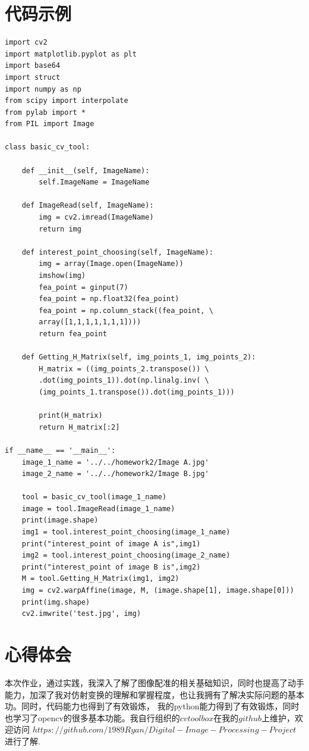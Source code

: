 \documentclass[UTF8]{ctexart}
\begin{document}
\section{代码示例}

\begin{lstlisting}
import cv2
import matplotlib.pyplot as plt
import base64
import struct
import numpy as np
from scipy import interpolate
from pylab import *
from PIL import Image

class basic_cv_tool:

	def __init__(self, ImageName):
		self.ImageName = ImageName

	def ImageRead(self, ImageName):
		img = cv2.imread(ImageName)
		return img
	
	def interest_point_choosing(self, ImageName):
		img = array(Image.open(ImageName))
		imshow(img)
		fea_point = ginput(7)
		fea_point = np.float32(fea_point)
		fea_point = np.column_stack((fea_point, \ 
		array([1,1,1,1,1,1,1])))
		return fea_point
	
	def Getting_H_Matrix(self, img_points_1, img_points_2):
		H_matrix = ((img_points_2.transpose()) \ 
		.dot(img_points_1)).dot(np.linalg.inv( \ 
		(img_points_1.transpose()).dot(img_points_1)))
		
		print(H_matrix)
		return H_matrix[:2]

if __name__ == '__main__':
	image_1_name = '../../homework2/Image A.jpg'
	image_2_name = '../../homework2/Image B.jpg'

	tool = basic_cv_tool(image_1_name)
	image = tool.ImageRead(image_1_name)
	print(image.shape)
	img1 = tool.interest_point_choosing(image_1_name)
	print("interest_point of image A is",img1)
	img2 = tool.interest_point_choosing(image_2_name)
	print("interest_point of image B is",img2)
	M = tool.Getting_H_Matrix(img1, img2)
	img = cv2.warpAffine(image, M, (image.shape[1], image.shape[0]))
	print(img.shape)
	cv2.imwrite('test.jpg', img)

\end{lstlisting}

\section{心得体会}

本次作业，通过实践，我深入了解了图像配准的相关基础知识，同时也提高了动手能力，加深了我对仿射变换的理解和掌握程度，也让我拥有了解决实际问题的基本功。同时，代码能力也得到了有效锻炼，
我的python能力得到了有效锻炼，同时也学习了opencv的很多基本功能。我自行组织的$cv toolbox$在我的$github$上维护，欢迎访问 \newline $https://github.com/1989Ryan/Digital-Image-Processing-Project$进行了解.
\end{document}
